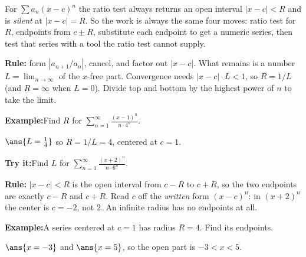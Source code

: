 \documentclass[12pt]{article}
\begin{document}

\noindent\small For $\sum a_n (x-c)^n$ the ratio test always returns an open
interval $|x-c| < R$ and is \emph{silent} at $|x-c| = R$. So the work is always
the same four moves: ratio test for $R$, endpoints from $c \pm R$, substitute
each endpoint to get a numeric series, then test that series with a tool the
ratio test cannot supply.\normalsize


\begin{formulabox}
\textbf{Rule:} form $\left|a_{n+1}/a_n\right|$, cancel, and factor out $|x-c|$.
What remains is a number $L = \lim_{n\to\infty}$ of the $x$-free part.
Convergence needs $|x-c| \cdot L < 1$, so $R = 1/L$ (and $R = \infty$ when
$L = 0$). Divide top and bottom by the highest power of $n$ to take the limit.
\end{formulabox}

\begin{examplebox}
\textbf{Example:}\quad Find $R$ for $\displaystyle\sum_{n=1}^{\infty}
\frac{(x-1)^n}{n \cdot 4^n}$.

$\ans{L = \tfrac{1}{4}}$ \quad so $R = 1/L = 4$, centered at $c = 1$.
\end{examplebox}

\begin{tryitbox}
\textbf{Try it:}\quad Find $L$ for $\displaystyle\sum_{n=1}^{\infty}
\frac{(x+2)^n}{n \cdot 6^n}$.\\[2pt]
\end{tryitbox}


\begin{formulabox}
\textbf{Rule:} $|x - c| < R$ is the open interval from $c - R$ to $c + R$, so
the two endpoints are exactly $c - R$ and $c + R$. Read $c$ off the
\emph{written} form $(x - c)^n$: in $(x+2)^n$ the center is $c = -2$, not $2$.
An infinite radius has no endpoints at all.
\end{formulabox}

\begin{examplebox}
\textbf{Example:}\quad A series centered at $c = 1$ has radius $R = 4$. Find its
endpoints.

$\ans{x = -3}$ \quad and \quad $\ans{x = 5}$, so the open part is $-3 < x < 5$.
\end{examplebox}
\end{document}
